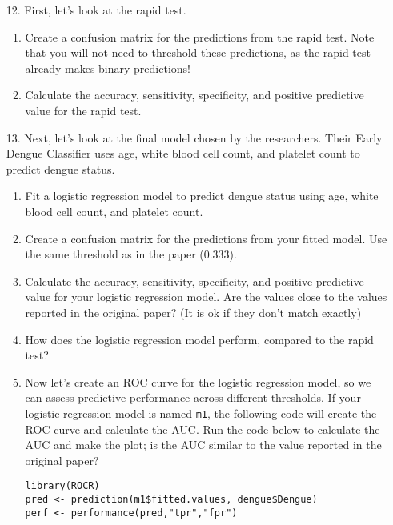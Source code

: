 \documentclass[11pt]{article}
\begin{document}
\begin{enumerate}
\item[12.] First, let's look at the rapid test. 

\begin{enumerate}
\item Create a confusion matrix for the predictions from the rapid test. Note that you will not need to threshold these predictions, as the rapid test already makes binary predictions!

\item Calculate the accuracy, sensitivity, specificity, and positive predictive value for the rapid test.
\end{enumerate}

\item[13.] Next, let's look at the final model chosen by the researchers. Their Early Dengue Classifier uses age, white blood cell count, and platelet count to predict dengue status. 

\begin{enumerate}
\item Fit a logistic regression model to predict dengue status using age, white blood cell count, and platelet count.

\item Create a confusion matrix for the predictions from your fitted model. Use the same threshold as in the paper (0.333).

\item Calculate the accuracy, sensitivity, specificity, and positive predictive value for your logistic regression model. Are the values close to the values reported in the original paper? (It is ok if they don't match exactly)

\item How does the logistic regression model perform, compared to the rapid test?

\item Now let's create an ROC curve for the logistic regression model, so we can assess predictive performance across different thresholds. If your logistic regression model is named \verb;m1;, the following code will create the ROC curve and calculate the AUC. Run the code below to calculate the AUC and make the plot; is the AUC similar to the value reported in the original paper?

\newpage

\begin{verbatim}
library(ROCR)
pred <- prediction(m1$fitted.values, dengue$Dengue)
perf <- performance(pred,"tpr","fpr")


\end{verbatim}
\end{enumerate}
\end{enumerate}
\end{document}
